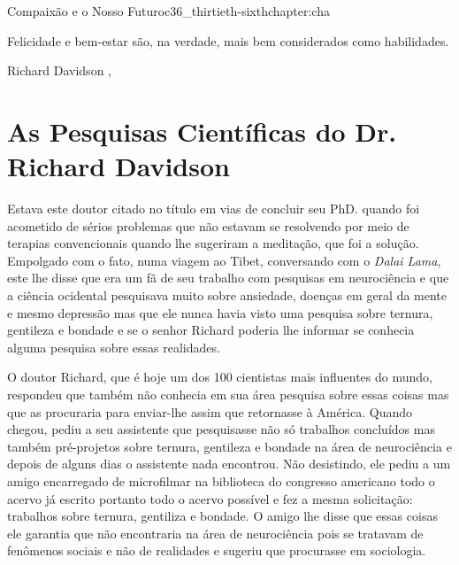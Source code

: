 \begin{chapterpage}{Compaixão e o Nosso Futuro}{c36_thirtieth-sixthchapter:cha}

\begin{myquotation}Felicidade e bem-estar são, na verdade, mais bem considerados como habilidades.
\par\vspace*{15mm}
\mbox{}\hfill \emdash{}Richard Davidson
, %
\par\end{myquotation}

\end{chapterpage}



\section{As Pesquisas Científicas do Dr. Richard Davidson}\label{c1_basicformatting:sec}

\emdash{}Estava este doutor citado no título em vias de concluir seu PhD. quando foi acometido de sérios problemas que não estavam se resolvendo por meio de terapias convencionais quando lhe sugeriram a meditação, que foi a solução. Empolgado com o fato, numa viagem ao Tibet, conversando com o \textit{Dalai Lama}, este lhe disse que era um fã de seu trabalho com pesquisas em neurociência e que a ciência ocidental pesquisava muito sobre ansiedade, doenças em geral da mente e mesmo depressão mas que ele nunca havia visto uma pesquisa sobre ternura, gentileza e bondade e se o senhor Richard poderia lhe informar se conhecia alguma pesquisa sobre essas realidades.

\emdash{}O doutor Richard, que é hoje um dos 100 cientistas mais influentes do mundo, respondeu que também não conhecia em sua área pesquisa sobre essas coisas mas que as procuraria para enviar-lhe assim que retornasse à América. Quando chegou, pediu a seu assistente que pesquisasse não só trabalhos concluídos mas também pré-projetos sobre ternura, gentileza e bondade na área de neurociência e depois de alguns dias o assistente nada encontrou. Não desistindo, ele pediu a um amigo encarregado de microfilmar na biblioteca do congresso americano todo o acervo já escrito portanto todo o acervo possível e fez a mesma solicitação: trabalhos sobre ternura, gentiliza e bondade. O amigo lhe disse que essas coisas ele garantia que não encontraria na área de neurociência pois se tratavam de fenômenos sociais e não de realidades e sugeriu que procurasse em sociologia.

